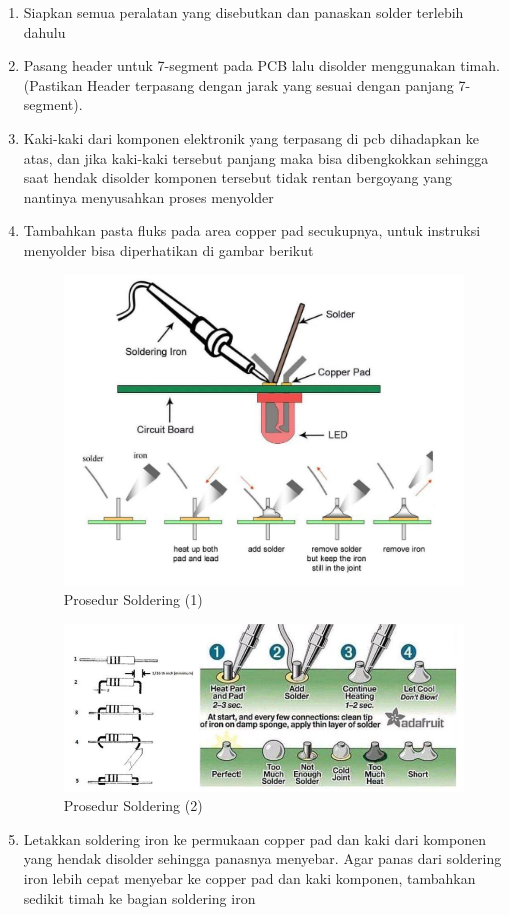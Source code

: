 \begin{enumerate}
    \item Siapkan semua peralatan yang disebutkan dan panaskan solder terlebih dahulu
    \item Pasang header untuk 7-segment pada PCB lalu disolder menggunakan timah. (Pastikan Header terpasang dengan jarak yang sesuai dengan panjang 7-segment).
    \item Kaki-kaki dari komponen  elektronik yang terpasang di pcb dihadapkan ke atas, dan jika kaki-kaki tersebut panjang maka bisa dibengkokkan sehingga saat hendak disolder komponen tersebut tidak rentan bergoyang yang nantinya menyusahkan proses menyolder
    \item Tambahkan pasta fluks pada area copper pad secukupnya, untuk instruksi menyolder bisa diperhatikan di gambar berikut
        \begin{figure}[H]
            \centering
            \includegraphics[width=0.6\linewidth]{P1/img/solder1.png}
            \caption{Prosedur Soldering (1)}
            \label{fig:ProsedurSoldering1}
        \end{figure}
        \begin{figure}[H]
            \centering
            \includegraphics[width=0.8\linewidth]{P1/img/solder2.png}
            \caption{Prosedur Soldering (2)}
            \label{fig:ProsedurSoldering2}
        \end{figure}
    \item Letakkan soldering iron ke permukaan copper pad dan kaki dari komponen yang hendak disolder sehingga panasnya menyebar. Agar panas dari soldering iron lebih cepat menyebar ke copper pad dan kaki komponen, tambahkan sedikit timah ke bagian soldering iron 

\end{enumerate}

